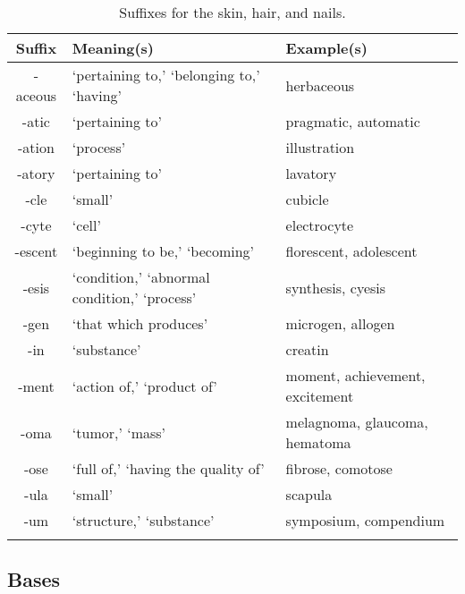 \begin{longtable}{c | p{} | p{}}
    \caption{Suffixes for the skin, hair, and nails.}
    \hline
    Suffix & Meaning(s) & Example(s) \\ \hline
        -aceous & `pertaining to,' `belonging to,' `having' & herbaceous \\
        -atic & `pertaining to' & pragmatic, automatic \\
        -ation & `process' & illustration \\
        -atory & `pertaining to' & lavatory \\
        -cle & `small' & cubicle \\
        -cyte & `cell' & electrocyte \\
        -escent & `beginning to be,' `becoming' & florescent, adolescent \\
        -esis & `condition,' `abnormal condition,' `process' & synthesis, cyesis \\
        -gen & `that which produces' & microgen, allogen \\
        -in & `substance' & creatin \\
        -ment & `action of,' `product of' & moment, achievement, excitement \\
        -oma & `tumor,' `mass' & melagnoma, glaucoma, hematoma \\
        -ose & `full of,' `having the quality of' & fibrose, comotose \\
        -ula & `small' & scapula \\
        -um & `structure,' `substance' & symposium, compendium \\
    \label{tab:Ch4Suffix}
\end{longtable}


\subsection{Bases}

